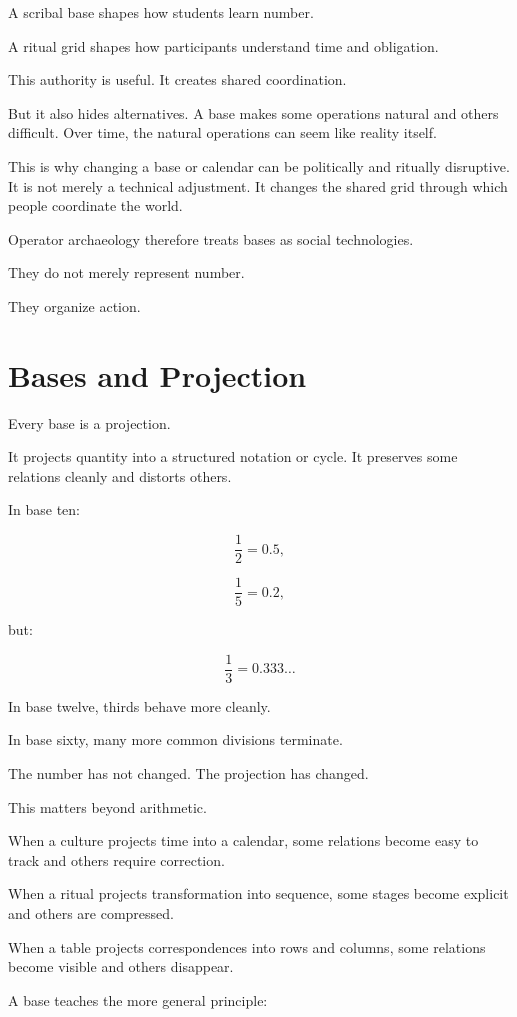 \documentclass[11pt]{book}
\begin{document}
A scribal base shapes how students learn number.

A ritual grid shapes how participants understand time and obligation.

This authority is useful. It creates shared coordination.

But it also hides alternatives. A base makes some operations natural and others difficult. Over time, the natural operations can seem like reality itself.

This is why changing a base or calendar can be politically and ritually disruptive. It is not merely a technical adjustment. It changes the shared grid through which people coordinate the world.

Operator archaeology therefore treats bases as social technologies.

They do not merely represent number.

They organize action.

\section{Bases and Projection}

Every base is a projection.

It projects quantity into a structured notation or cycle. It preserves some relations cleanly and distorts others.

In base ten:

\[
\frac{1}{2} = 0.5,
\]

\[
\frac{1}{5} = 0.2,
\]

but:

\[
\frac{1}{3} = 0.333\ldots
\]

In base twelve, thirds behave more cleanly.

In base sixty, many more common divisions terminate.

The number has not changed. The projection has changed.

This matters beyond arithmetic.

When a culture projects time into a calendar, some relations become easy to track and others require correction.

When a ritual projects transformation into sequence, some stages become explicit and others are compressed.

When a table projects correspondences into rows and columns, some relations become visible and others disappear.

A base teaches the more general principle:
\end{document}

